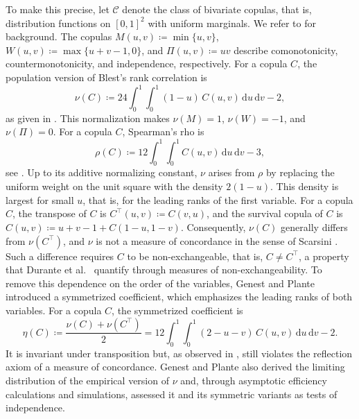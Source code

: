 \documentclass[11pt,a4paper]{article}
\theoremstyle{remark}
\newcommand{\de}{\,\mathrm{d}}
\newcommand{\1}{\mathbf{1}}
\newcommand{\CC}{\mathcal{C}}
\begin{document}
To make this precise, let $\CC$ denote the class of bivariate copulas, that is, distribution functions on $[0,1]^2$ with uniform marginals.
We refer to \cite{nelsen2006introduction,durante2016principles} for background.
The copulas $M(u,v)\coloneqq\min\{u,v\}$, $W(u,v)\coloneqq\max\{u+v-1,0\}$, and $\Pi(u,v)\coloneqq uv$ describe comonotonicity, countermonotonicity, and independence, respectively.
For a copula $C$, the population version of Blest's rank correlation is
\begin{equation}
  \label{eq:nu-def}
  \nu(C)\coloneqq24\int_0^1\!\int_0^1(1-u)\,C(u,v)\de u\de v-2,
\end{equation}
as given in \cite[Sec.~3]{genest2003blest}.
This normalization makes $\nu(M)=1$, $\nu(W)=-1$, and $\nu(\Pi)=0$.
For a copula $C$, Spearman's rho is
\begin{equation}
  \label{eq:rho-def}
  \rho(C)\coloneqq12\int_0^1\!\int_0^1 C(u,v)\de u\de v-3,
\end{equation}
see \cite[Sec.~5.1.2]{nelsen2006introduction}.
Up to its additive normalizing constant, $\nu$ arises from $\rho$ by replacing the uniform weight on the unit square with the density $2(1-u)$.
This density is largest for small $u$, that is, for the leading ranks of the first variable.
For a copula $C$, the transpose of $C$ is $C^\top(u,v)\coloneqq C(v,u)$, and the survival copula of $C$ is $\widehat C(u,v)\coloneqq u+v-1+C(1-u,1-v)$.
Consequently, $\nu(C)$ generally differs from $\nu(C^\top)$, and $\nu$ is not a measure of concordance in the sense of Scarsini \cite{scarsini1984measures}.
Such a difference requires $C$ to be non-exchangeable, that is, $C\neq C^\top$, a property that Durante et al.~\cite{durante2010measures} quantify through measures of non-exchangeability.
To remove this dependence on the order of the variables, Genest and Plante \cite[Sec.~4]{genest2003blest} introduced a symmetrized coefficient, which emphasizes the leading ranks of both variables.
For a copula $C$, the symmetrized coefficient is
\begin{equation}
  \label{eq:eta-def}
  \eta(C)\coloneqq\frac{\nu(C)+\nu(C^\top)}{2}
  =12\int_0^1\!\int_0^1(2-u-v)\,C(u,v)\de u\de v-2.
\end{equation}
It is invariant under transposition but, as observed in \cite[Sec.~4]{genest2003blest}, still violates the reflection axiom of a measure of concordance.
Genest and Plante also derived the limiting distribution of the empirical version of $\nu$ and, through asymptotic efficiency calculations and simulations, assessed it and its symmetric variants as tests of independence.
\end{document}
